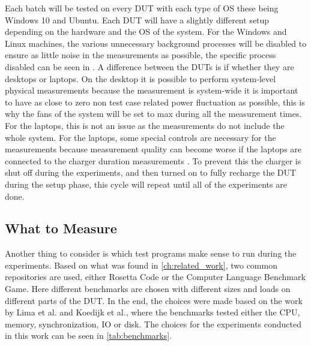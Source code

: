 Each batch will be tested on every DUT with each type of OS these being Windows 10 and Ubuntu. Each DUT will have a slightly different setup depending on the hardware and the OS of the system. For the Windows and Linux machines, the various unnecessary background processes will be disabled to ensure as little noise in the measurements as possible\cite*[]{sestoft2013microbenchmarks}, the specific process disabled can be seen in . A difference between the DUTs is if whether they are desktops or laptops. On the desktop it is possible to perform system-level physical measurements because the measurement is system-wide it is important to have as close to zero non test case related power fluctuation as possible, this is why the fans of the system will be set to max during all the measurement times. For the laptops, this is not an issue as the measurements do not include the whole system. For the laptops, some special controls are necessary for the measurements because measurement quality can become worse if the laptops are connected to the charger duration measurements \cite{E3Video}. To prevent this the charger is shut off during the experiments, and then turned on to fully recharge the DUT during the setup phase, this cycle will repeat until all of the experiments are done.

\subsection{What to Measure}

Another thing to consider is which test programs make sense to run during the experiments. Based on what was found in \cref*{ch:related_work}, two common repositories are used, either Rosetta Code\cite*[]{rosetta_code} or the Computer Language Benchmark Game\cite*[]{benchmark_game}. Here different benchmarks are chosen with different sizes and loads on different parts of the DUT. In the end, the choices were made based on the work by Lima et al.\cite*[]{greenland2016statistical} and Koedijk et al.\cite*[]{Koedijk2022diff}, where the benchmarks tested either the CPU, memory, synchronization, IO or disk. The choices for the experiments conducted in this work can be seen in \cref*{tab:benchmarks}.




